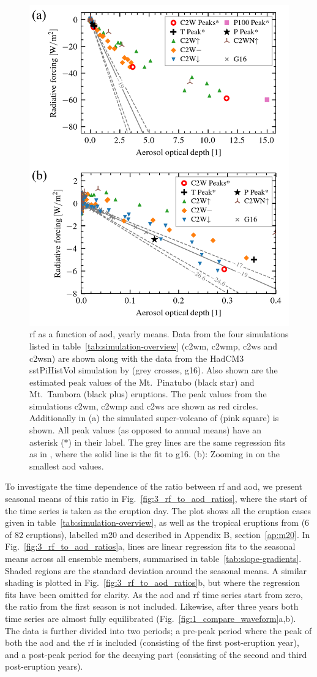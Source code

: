 \documentclass{ametsocV6.1}
\begin{document}
\begin{figure}
  \centering
  \includegraphics[width=0.5\linewidth]{figures/figure2.png}

  \caption{\gls{rf} as a function of \gls{aod}, yearly means. Data from the four
    simulations listed in table~\ref{tab:simulation-overview} (\gls{c2wm}, \gls{c2wmp},
    \gls{c2ws} and \gls{c2wsn}) are shown along with the data from the HadCM3 sstPiHistVol
    simulation by \citet{gregory2016} (grey crosses, \gls{g16}). Also shown are the
    estimated peak values of the Mt.\ Pinatubo (black star) and Mt.\ Tambora (black plus)
    eruptions. The peak values from the simulations \gls{c2wm}, \gls{c2wmp} and \gls{c2ws}
    are shown as red circles. Additionally in (a) the simulated super-volcano of
    \citet{jones2005} (pink square) is shown. All peak values (as opposed to annual means)
    have an asterisk (\(\ast{}\)) in their label. The grey lines are the same regression
    fits as in \citet[][Fig.\ 4]{gregory2016}, where the solid line is the fit to \gls{g16}.
    (b): Zooming in on the smallest \gls{aod} values.}\label{fig:2_rf_vs_aod_slopes}%
\end{figure}

To investigate the time dependence of the ratio between \gls{rf} and \gls{aod}, we
present seasonal means of this ratio in Fig.~\ref{fig:3_rf_to_aod_ratios}, where the
start of the time series is taken as the eruption day. The plot shows all the eruption
cases given in table~\ref{tab:simulation-overview}, as well as the tropical eruptions
from \citet{marshall2020dataset} (\(6\) of \(82\) eruptions), labelled \gls{m20} and
described in Appendix B, section~\ref{ap:m20}. In Fig.~\ref{fig:3_rf_to_aod_ratios}a,
lines are linear regression fits to the seasonal means across all ensemble members,
summarised in table~\ref{tab:slope-gradients}. Shaded regions are the standard deviation
around the seasonal means. A similar shading is plotted in
Fig.~\ref{fig:3_rf_to_aod_ratios}b, but where the regression fits have been omitted for
clarity. As the \gls{aod} and \gls{rf} time series start from zero, the ratio from the
first season is not included. Likewise, after three years both time series are almost
fully equilibrated (Fig.~\ref{fig:1_compare_waveform}a,b). The data is further divided
into two periods; a pre-peak period where the peak of both the \gls{aod} and the
\gls{rf} is included (consisting of the first post-eruption year), and a post-peak
period for the decaying part (consisting of the second and third post-eruption years).
\end{document}

